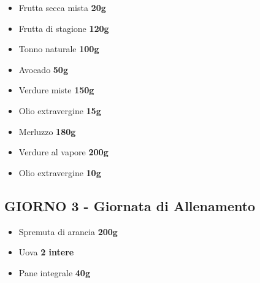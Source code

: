 \documentclass[11pt,a4paper]{article}
\begin{document}
\begin{tcolorbox}[colback=lightgray,colframe=accentcolor,boxrule=1pt,arc=3pt,title=\textbf{MERENDA MATTUTINA}]
\begin{itemize}[leftmargin=*,itemsep=0pt]
\item Frutta secca mista \textbf{20g}
\item Frutta di stagione \textbf{120g}
\end{itemize}
\end{tcolorbox}

\begin{tcolorbox}[colback=lightgray,colframe=accentcolor,boxrule=1pt,arc=3pt,title=\textbf{PRANZO - Insalata Ricca}]
\begin{itemize}[leftmargin=*,itemsep=0pt]
\item Tonno naturale \textbf{100g}
\item Avocado \textbf{50g}
\item Verdure miste \textbf{150g}
\item Olio extravergine \textbf{15g}
\end{itemize}
\end{tcolorbox}

\begin{tcolorbox}[colback=lightgray,colframe=accentcolor,boxrule=1pt,arc=3pt,title=\textbf{CENA}]
\begin{itemize}[leftmargin=*,itemsep=0pt]
\item Merluzzo \textbf{180g}
\item Verdure al vapore \textbf{200g}
\item Olio extravergine \textbf{10g}
\end{itemize}
\end{tcolorbox}

\newpage

\subsection{GIORNO 3 - Giornata di Allenamento}

\begin{tcolorbox}[colback=lightgray,colframe=accentcolor,boxrule=1pt,arc=3pt,title=\textbf{COLAZIONE}]
\begin{itemize}[leftmargin=*,itemsep=0pt]
\item Spremuta di arancia \textbf{200g}
\item Uova \textbf{2 intere}
\item Pane integrale \textbf{40g}
\end{itemize}
\end{tcolorbox}
\end{document}
